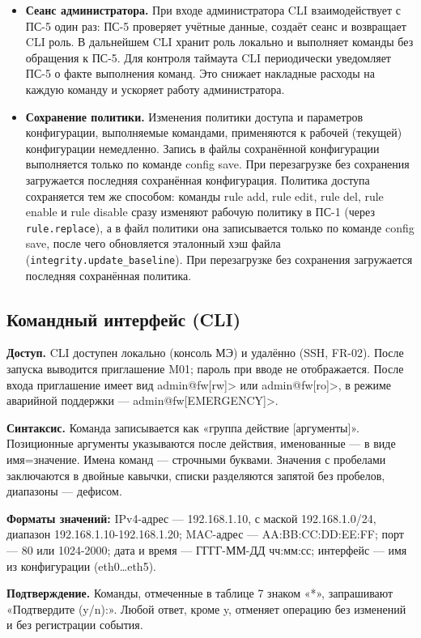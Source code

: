\documentclass[13pt,a4paper,final]{article}
\begin{document}
\begin{itemize}
		\item \textbf{Сеанс администратора.} При входе администратора CLI взаимодействует с ПС-5 один раз: ПС-5 проверяет учётные данные, создаёт сеанс и возвращает CLI роль. В дальнейшем CLI хранит роль локально и выполняет команды без обращения к ПС-5. Для контроля таймаута CLI периодически уведомляет ПС-5 о факте выполнения команд. Это снижает накладные расходы на каждую команду и ускоряет работу администратора.
		
		\item \textbf{Сохранение политики.} Изменения политики доступа и параметров конфигурации, выполняемые командами, применяются к рабочей (текущей) конфигурации немедленно. Запись в файлы сохранённой конфигурации выполняется только по команде config save. При перезагрузке без сохранения загружается последняя сохранённая конфигурация. Политика доступа сохраняется тем же способом: команды rule add, rule edit, rule del, rule enable и rule disable сразу изменяют рабочую политику в ПС-1 (через \texttt{rule.replace}), а в файл политики она записывается только по команде config save, после чего обновляется эталонный хэш файла (\texttt{integrity.update\_baseline}). При перезагрузке без сохранения загружается последняя сохранённая политика.
	\end{itemize}
	
	\subsection{Командный интерфейс (CLI)}
	\textbf{Доступ.} CLI доступен локально (консоль МЭ) и удалённо (SSH, FR-02). После запуска выводится приглашение M01; пароль при вводе не отображается. После входа приглашение имеет вид admin@fw[rw]> или admin@fw[ro]>, в режиме аварийной поддержки — admin@fw[EMERGENCY]>.
	
	\textbf{Синтаксис.} Команда записывается как «группа действие [аргументы]». Позиционные аргументы указываются после действия, именованные — в виде имя=значение. Имена команд — строчными буквами. Значения с пробелами заключаются в двойные кавычки, списки разделяются запятой без пробелов, диапазоны — дефисом.
	
	\textbf{Форматы значений:} IPv4-адрес — 192.168.1.10, с маской 192.168.1.0/24, диапазон 192.168.1.10-192.168.1.20; MAC-адрес — AA:BB:CC:DD:EE:FF; порт — 80 или 1024-2000; дата и время — ГГГГ-ММ-ДД чч:мм:сс; интерфейс — имя из конфигурации (eth0…eth5).
	
	\textbf{Подтверждение.} Команды, отмеченные в таблице 7 знаком «*», запрашивают «Подтвердите (y/n):». Любой ответ, кроме y, отменяет операцию без изменений и без регистрации события.
	
\end{document}
